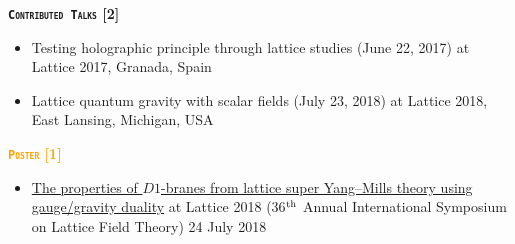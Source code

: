\textcolor{bittersweet}{\textbf{\textsc{\fontsize{10}{38} \bfseries \texttt{Contributed Talks} [2]}}}
\begin{itemize}
  \item Testing holographic principle through lattice studies (June 22, 2017) at Lattice 2017, Granada, Spain
  \item Lattice quantum gravity with scalar fields (July 23, 2018) at Lattice 2018, East Lansing, Michigan, USA   
\end{itemize}
 

\textcolor{orange}{\textbf{\textsc{\fontsize{10}{38} \bfseries \texttt{Poster} [1]}}}
  \begin{itemize}
 \item \href{https://indico.fnal.gov/event/15949/session/4/contribution/66}{The properties of $D1$-branes from lattice super Yang--Mills theory using gauge/gravity duality} at Lattice 2018 (36$^{\rm{th}}$ Annual International Symposium on Lattice Field Theory) \hfill 24 July 2018
\end{itemize}
